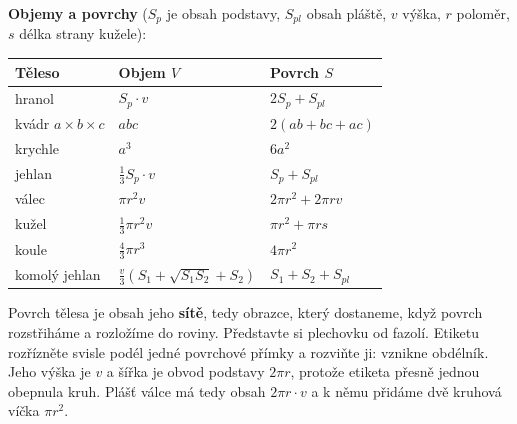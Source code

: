 \begin{definitionbox}
  \textbf{Objemy a povrchy} ($S_p$ je obsah podstavy, $S_{pl}$ obsah pláště, $v$ výška, $r$ poloměr, $s$ délka strany kužele):
  \begin{center}
    \renewcommand{\arraystretch}{1.6}
    \begin{tabular}{|l|l|l|}
      \hline
      Těleso & Objem $V$ & Povrch $S$ \\
      \hline
      hranol & $S_p\cdot v$ & $2S_p + S_{pl}$ \\
      kvádr $a\times b\times c$ & $abc$ & $2(ab + bc + ac)$ \\
      krychle & $a^3$ & $6a^2$ \\
      jehlan & $\frac{1}{3}S_p\cdot v$ & $S_p + S_{pl}$ \\
      válec & $\pi r^2v$ & $2\pi r^2 + 2\pi rv$ \\
      kužel & $\frac{1}{3}\pi r^2v$ & $\pi r^2 + \pi rs$ \\
      koule & $\frac{4}{3}\pi r^3$ & $4\pi r^2$ \\
      komolý jehlan & $\frac{v}{3}\left(S_1 + \sqrt{S_1S_2} + S_2\right)$ & $S_1 + S_2 + S_{pl}$ \\
      \hline
    \end{tabular}
  \end{center}
\end{definitionbox}

Povrch tělesa je obsah jeho \textbf{sítě}, tedy obrazce, který dostaneme, když povrch rozstřiháme a rozložíme do roviny. Představte si plechovku od fazolí. Etiketu rozřízněte svisle podél jedné povrchové přímky a rozviňte ji: vznikne obdélník. Jeho výška je $v$ a šířka je obvod podstavy $2\pi r$, protože etiketa přesně jednou obepnula kruh. Plášť válce má tedy obsah $2\pi r\cdot v$ a k němu přidáme dvě kruhová víčka $\pi r^2$.

